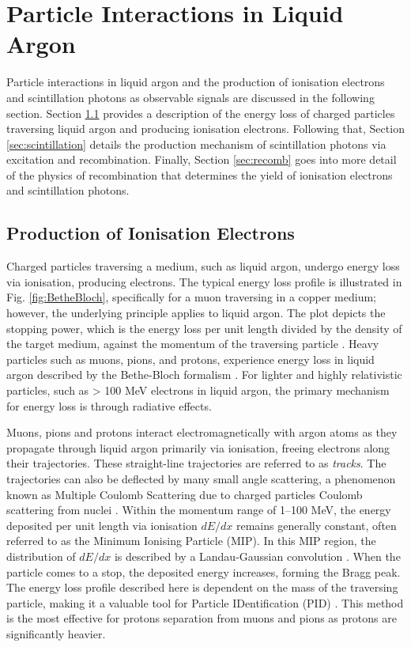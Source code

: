 \section{Particle Interactions in Liquid Argon}
\label{sec3:creation}

Particle interactions in liquid argon and the production of ionisation electrons and scintillation photons as observable signals are discussed in the following section.       
Section \ref{sec3:bethebloch} provides a description of the energy loss of charged particles traversing liquid argon and producing ionisation electrons.                          
Following that, Section \ref{sec:scintillation} details the production mechanism of scintillation photons via excitation and recombination.                                       
Finally, Section \ref{sec:recomb} goes into more detail of the physics of recombination that determines the yield of ionisation electrons and scintillation photons.

\subsection{Production of Ionisation Electrons}
\label{sec3:bethebloch}

Charged particles traversing a medium, such as liquid argon, undergo energy loss via ionisation, producing electrons.                                                                       
The typical energy loss profile is illustrated in Fig. \ref{fig:BetheBloch}, specifically for a muon traversing in a copper medium; however, the underlying principle applies to liquid argon.
The plot depicts the stopping power, which is the energy loss per unit length divided by the density of the target medium, against the momentum of the traversing particle \cite{Passage}.
Heavy particles such as muons, pions, and protons, experience energy loss in liquid argon described by the Bethe-Bloch formalism \cite{Passage}.
For lighter and highly relativistic particles, such as > 100 MeV electrons in liquid argon, the primary mechanism for energy loss is through radiative effects.

Muons, pions and protons interact electromagnetically with argon atoms as they propagate through liquid argon primarily via ionisation, freeing electrons along their trajectories.
These straight-line trajectories are referred to as \textit{tracks}.
The trajectories can also be deflected by many small angle scattering, a phenomenon known as Multiple Coulomb Scattering due to charged particles Coulomb scattering from nuclei \cite{Passage}. 
Within the momentum range of 1--100 MeV, the energy deposited per unit length via ionisation $dE/dx$ remains generally constant, often referred to as the Minimum Ionising Particle (MIP).
In this MIP region, the distribution of $dE/dx$ is described by a Landau-Gaussian convolution \cite{Passage}. 
When the particle comes to a stop, the deposited energy increases, forming the Bragg peak.
The energy loss profile described here is dependent on the mass of the traversing particle, making it a valuable tool for Particle IDentification (PID) \cite{argoneut}.
This method is the most effective for protons separation from muons and pions as protons are significantly heavier.

